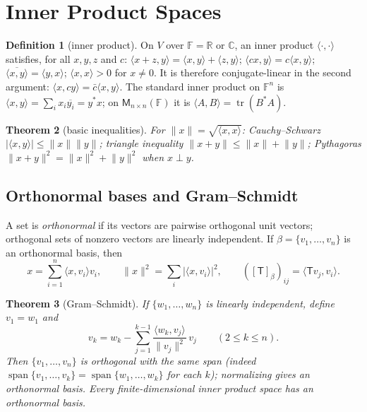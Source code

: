 \documentclass[12pt]{article}
\newtheorem{theorem}{Theorem}[section]
\theoremstyle{definition}
\newtheorem{definition}[theorem]{Definition}
\theoremstyle{remark}
\newcommand{\F}{\mathbb{F}}
\newcommand{\R}{\mathbb{R}}
\newcommand{\C}{\mathbb{C}}
\newcommand{\M}{\mathsf{M}}
\newcommand{\T}{\mathsf{T}}
\newcommand{\ip}[2]{\langle #1,#2\rangle}
\newcommand{\norm}[1]{\lVert #1\rVert}
\DeclareMathOperator{\spn}{span}
\DeclareMathOperator{\tr}{tr}
\begin{document}
\section{Inner Product Spaces}

\begin{definition}[inner product]
On $V$ over $\F=\R$ or $\C$, an inner product $\ip{\cdot}{\cdot}$ satisfies, for all $x,y,z$ and $c$:
$\ip{x+z}{y}=\ip{x}{y}+\ip{z}{y}$; $\ip{cx}{y}=c\ip{x}{y}$; $\overline{\ip{x}{y}}=\ip{y}{x}$; $\ip{x}{x}>0$ for $x\neq0$.
It is therefore conjugate-linear in the second argument: $\ip{x}{cy}=\bar c\ip{x}{y}$.
The standard inner product on $\F^n$ is $\ip{x}{y}=\sum_i x_i\overline{y_i}=y^*x$; on $\M_{n\times n}(\F)$ it is $\ip{A}{B}=\tr(B^*A)$.
\end{definition}

\begin{theorem}[basic inequalities]
For $\norm{x}=\sqrt{\ip{x}{x}}$:\;
Cauchy–Schwarz $\lvert\ip{x}{y}\rvert\le\norm{x}\norm{y}$;\;
triangle inequality $\norm{x+y}\le\norm{x}+\norm{y}$;\;
Pythagoras $\norm{x+y}^2=\norm{x}^2+\norm{y}^2$ when $x\perp y$.
\end{theorem}

\subsection{Orthonormal bases and Gram–Schmidt}
A set is \emph{orthonormal} if its vectors are pairwise orthogonal unit vectors; orthogonal sets of nonzero vectors are linearly independent.
If $\beta=\{v_1,\dots,v_n\}$ is an orthonormal basis, then
\[
x=\sum_{i=1}^n\ip{x}{v_i}v_i,\qquad \norm{x}^2=\sum_i\lvert\ip{x}{v_i}\rvert^2,\qquad ([\T]_\beta)_{ij}=\ip{\T v_j}{v_i}.
\]

\begin{theorem}[Gram–Schmidt]
If $\{w_1,\dots,w_n\}$ is linearly independent, define $v_1=w_1$ and
\[
v_k=w_k-\sum_{j=1}^{k-1}\frac{\ip{w_k}{v_j}}{\norm{v_j}^2}\,v_j\qquad(2\le k\le n).
\]
Then $\{v_1,\dots,v_n\}$ is orthogonal with the same span (indeed $\spn\{v_1,\dots,v_k\}=\spn\{w_1,\dots,w_k\}$ for each $k$);
normalizing gives an orthonormal basis. Every finite-dimensional inner product space has an orthonormal basis.
\end{theorem}

\end{document}
